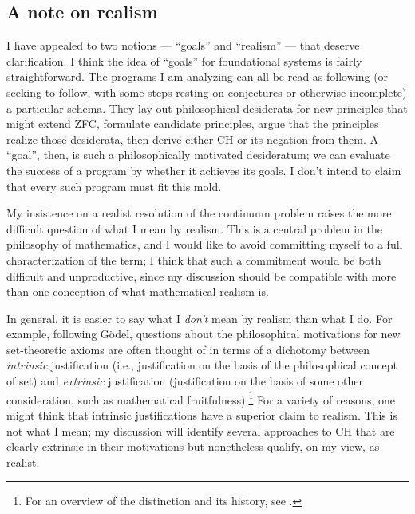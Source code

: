 \documentclass[letterpaper,12pt]{article}
\begin{document}
\subsection{A note on realism}
I have appealed to two notions --- ``goals'' and ``realism'' --- that deserve clarification. I think the idea of ``goals'' for foundational systems is fairly straightforward. The programs I am analyzing can all be read as following (or seeking to follow, with some steps resting on conjectures or otherwise incomplete) a particular schema. They lay out philosophical desiderata for new principles that might extend ZFC, formulate candidate principles, argue that the principles realize those desiderata, then derive either CH or its negation from them. A ``goal'', then, is such a philosophically motivated desideratum; we can evaluate the success of a program by whether it achieves its goals. I don't intend to claim that every such program must fit this mold.

My insistence on a realist resolution of the continuum problem raises the more difficult question of what I mean by realism. This is a central problem in the philosophy of mathematics, and I would like to avoid committing myself to a full characterization of the term; I think that such a commitment would be both difficult and unproductive, since my discussion should be compatible with more than one conception of what mathematical realism is.

In general, it is easier to say what I \emph{don't} mean by realism than what I do. For example, following G\"odel, questions about the philosophical motivations for new set-theoretic axioms are often thought of in terms of a dichotomy between \emph{intrinsic} justification (i.e., justification on the basis of the philosophical concept of set) and \emph{extrinsic} justification (justification on the basis of some other consideration, such as mathematical fruitfulness).\footnote{For an overview of the distinction and its history, see \cite{koellner2009reflection}.} For a variety of reasons, one might think that intrinsic justifications have a superior claim to realism. This is not what I mean; my discussion will identify several approaches to CH that are clearly extrinsic in their motivations but nonetheless qualify, on my view, as realist.

\end{document}

